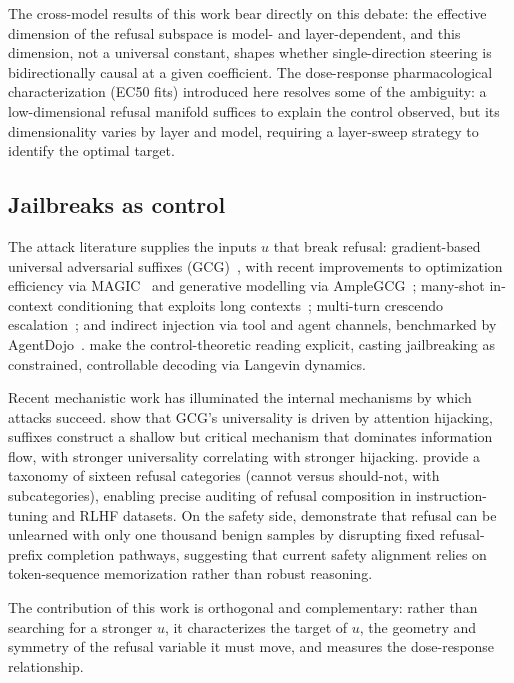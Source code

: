 The cross-model results of this work bear directly on this debate: the effective
dimension of the refusal subspace is model- and layer-dependent, and this
dimension, not a universal constant, shapes whether single-direction steering is
bidirectionally causal at a given coefficient. The dose-response pharmacological
characterization (EC50 fits) introduced here resolves some of the ambiguity: a
low-dimensional refusal manifold suffices to explain the control observed, but its
dimensionality varies by layer and model, requiring a layer-sweep strategy to
identify the optimal target.

\subsection{Jailbreaks as control}
The attack literature supplies the inputs $u$ that break refusal: gradient-based
universal adversarial suffixes (GCG)~\cite{zou2023universal}, with recent
improvements to optimization efficiency via MAGIC~\cite{li2024magic} and generative
modelling via AmpleGCG~\cite{liao2024ample}; many-shot in-context conditioning that
exploits long contexts~\cite{anil2024manyshot}; multi-turn crescendo
escalation~\cite{russinovich2024crescendo}; and indirect injection via tool and
agent channels, benchmarked by AgentDojo~\cite{debenedetti2024agentdojo}.
\citet{guo2024coldattack} make the control-theoretic reading explicit, casting
jailbreaking as constrained, controllable decoding via Langevin dynamics.

Recent mechanistic work has illuminated the internal mechanisms by which attacks
succeed. \citet{ben_tov2025universal} show that GCG's universality is driven by
attention hijacking, suffixes construct a shallow but critical mechanism that
dominates information flow, with stronger universality correlating with stronger
hijacking. \citet{von_recum2024cannot} provide a taxonomy of sixteen refusal
categories (cannot versus should-not, with subcategories), enabling precise auditing
of refusal composition in instruction-tuning and RLHF datasets. On the safety side,
\citet{guo2026llms} demonstrate that refusal can be unlearned with only one thousand
benign samples by disrupting fixed refusal-prefix completion pathways, suggesting
that current safety alignment relies on token-sequence memorization rather than
robust reasoning.

The contribution of this work is orthogonal and complementary: rather than searching
for a stronger $u$, it characterizes the target of $u$, the geometry and
symmetry of the refusal variable it must move, and measures the dose-response
relationship.

